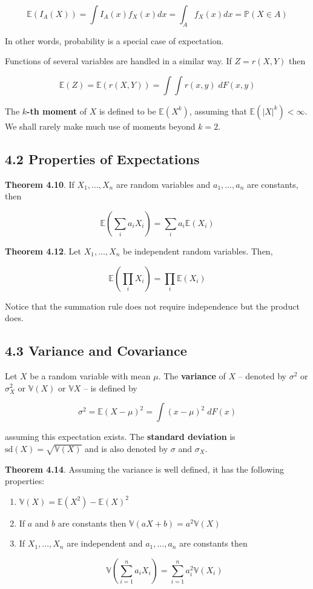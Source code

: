 \[ \mathbb{E}(I_A(X)) = \int I_A(x) f_X(x) dx = \int_A f_X(x) dx = \mathbb{P}(X \in A) \]

In other words, probability is a special case of expectation.

Functions of several variables are handled in a similar way. If
\(Z = r(X, Y)\) then

\[ \mathbb{E}(Z) = \mathbb{E}(r(X, Y)) = \int \int r(x, y) \; dF(x, y) \]

The \textbf{\(k\)-th moment} of \(X\) is defined to be
\(\mathbb{E}(X^k)\), assuming that \(\mathbb{E}(|X|^k) < \infty\). We
shall rarely make much use of moments beyond \(k = 2\).

\subsection{4.2 Properties of
Expectations}\label{properties-of-expectations}

\textbf{Theorem 4.10}. If \(X_1, \dots, X_n\) are random variables and
\(a_1, \dots, a_n\) are constants, then

\[ \mathbb{E}\left( \sum_i a_i X_i \right) = \sum_i a_i \mathbb{E}(X_i) \]

\textbf{Theorem 4.12}. Let \(X_1, \dots, X_n\) be independent random
variables. Then,

\[ \mathbb{E}\left(\prod_i X_i \right) = \prod_i \mathbb{E}(X_i) \]

Notice that the summation rule does not require independence but the
product does.

\subsection{4.3 Variance and
Covariance}\label{variance-and-covariance}

Let \(X\) be a random variable with mean \(\mu\). The \textbf{variance}
of \(X\) -- denoted by \(\sigma^2\) or \(\sigma_X^2\) or
\(\mathbb{V}(X)\) or \(\mathbb{V}X\) -- is defined by

\[ \sigma^2 = \mathbb{E}(X - \mu)^2 = \int (x - \mu)^2\; dF(x) \]

assuming this expectation exists. The \textbf{standard deviation} is
\(\text{sd}(X) = \sqrt{\mathbb{V}(X)}\) and is also denoted by
\(\sigma\) and \(\sigma_X\).

\textbf{Theorem 4.14}. Assuming the variance is well defined, it has the
following properties:

\begin{enumerate}[label={\arabic*.}]
\item
  \(\mathbb{V}(X) = \mathbb{E}(X^2) - \mathbb{E}(X)^2\)
\item
  If \(a\) and \(b\) are constants then
  \(\mathbb{V}(aX + b) = a^2 \mathbb{V}(X)\)
\item
  If \(X_1, \dots, X_n\) are independent and \(a_1, \dots, a_n\) are
  constants then

  \[ \mathbb{V}\left( \sum_{i=1}^n a_iX_i \right) = \sum_{i=1}^n a_i^2 \mathbb{V}(X_i) \]
\end{enumerate}

